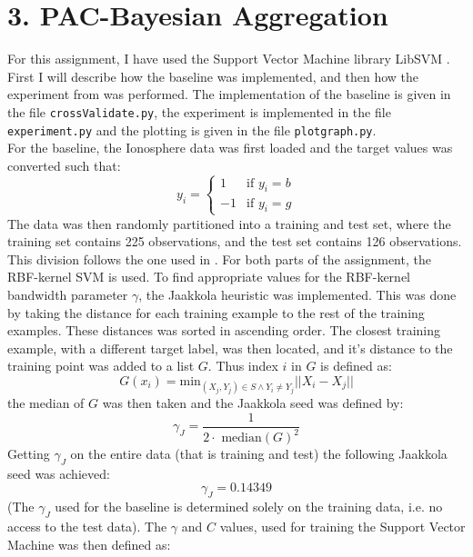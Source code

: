 \documentclass{article}
\begin{document}
\section{3. PAC-Bayesian Aggregation}
For this assignment, I have used the Support Vector Machine library LibSVM \cite{svm}. First I will describe how the baseline was implemented, and then how the experiment from \cite{article} was performed. The implementation of the baseline is given in the file \texttt{crossValidate.py}, the experiment is implemented in the file \texttt{experiment.py} and the plotting is given in the file \texttt{plotgraph.py}. \\ For the baseline, the Ionosphere data \cite{data} was first loaded and the target values was converted such that:
\begin{equation}
y_i = \begin{cases}
1 &\text{if $y_i = b$}\\
-1 &\text{if $y_i = g$}
\end{cases}
\end{equation}
The data was then randomly partitioned into a training and test set, where the training set contains 225 observations, and the test set contains 126 observations. This division follows the one used in \cite{article}. For both parts of the assignment, the RBF-kernel SVM is used. To find appropriate values for the RBF-kernel bandwidth parameter $\gamma$, the Jaakkola heuristic was implemented. This was done by taking the distance for each training example to the rest of the training examples. These distances was sorted in ascending order. The closest training example, with a different target label, was then located, and it's distance to the training point was added to a list $G$. Thus index $i$ in $G$ is defined as:
\begin{equation}
G(x_i) = \text{min}_{(X_j,Y_j)\in S \wedge Y_i \neq Y_j} ||X_i - X_j||
\end{equation}
the median of $G$ was then taken and the Jaakkola seed was defined by:
\begin{equation}
\gamma_J = \dfrac{1}{2 \cdot \text{ median}(G)^2}
\end{equation}
Getting $\gamma_J$ on the entire data (that is training and test) the following Jaakkola seed was achieved:
\begin{equation}
\gamma_J = 0.14349
\end{equation}
(The $\gamma_J$ used for the baseline is determined solely on the training data, i.e. no access to the test data).
The $\gamma$ and $C$ values, used for training the Support Vector Machine was then defined as:
\end{document}
